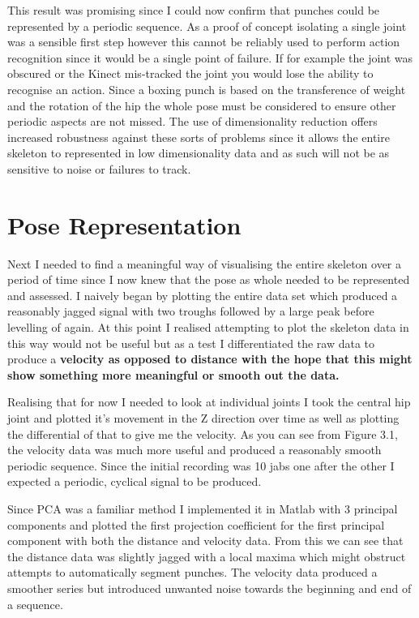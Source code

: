This result was promising since I could now confirm that punches could be represented by a periodic sequence. As a proof of concept isolating a single joint was a sensible first step however this cannot be reliably used to perform action recognition since it would be a single point of failure.  
If for example the joint was obscured or the Kinect mis-tracked the joint you would lose the ability to recognise an action. Since a boxing punch is based on the transference of weight and the rotation of the hip the whole pose must be considered to ensure other periodic aspects are not missed. The use of dimensionality reduction offers increased robustness against these sorts of problems since it allows the entire skeleton to represented in low dimensionality data and as such will not be as sensitive to noise or failures to track. 


\section{Pose Representation}
Next I needed to find a meaningful way of visualising the entire skeleton over a period of time since I now knew that the pose as whole needed to be represented and assessed. I naively began by plotting the entire data set which produced a reasonably jagged signal with two troughs followed by a large peak before levelling of again. At this point I realised attempting to plot the skeleton data in this way would not be useful but as a test I differentiated the raw data to produce a {\bf velocity as opposed to distance with the hope that this might show something more meaningful or smooth out the data.} 

Realising that for now I needed to look at individual joints I took the central hip joint and plotted it's movement in the Z direction over time as well as plotting the differential of that to give me the velocity. As you can see from Figure 3.1, the velocity data was much more useful and produced a reasonably smooth periodic sequence. Since the initial recording was 10 jabs one after the other I expected a periodic, cyclical signal to be produced.

Since PCA was a familiar method I implemented it in Matlab with 3 principal components and plotted the first projection coefficient for the first principal component with both the distance and velocity data. From this we can see that the distance data was slightly jagged with a local maxima which might obstruct attempts to automatically segment punches. The velocity data produced a smoother series but introduced unwanted noise towards the beginning and end of a sequence.\clearpage


